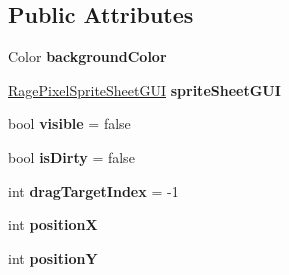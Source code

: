 \subsection*{Public Attributes}
\begin{DoxyCompactItemize}
\item 
Color {\bfseries background\-Color}
\item 
\hypertarget{class_rage_pixel_anim_strip_g_u_i_ab1b522fdd7b0087c4ab464920e52d4aa}{\hyperlink{class_rage_pixel_sprite_sheet_g_u_i}{Rage\-Pixel\-Sprite\-Sheet\-G\-U\-I} {\bfseries sprite\-Sheet\-G\-U\-I}}\label{class_rage_pixel_anim_strip_g_u_i_ab1b522fdd7b0087c4ab464920e52d4aa}

\item 
\hypertarget{class_rage_pixel_anim_strip_g_u_i_ab22e679229cfefcc46ca470488d49c00}{bool {\bfseries visible} = false}\label{class_rage_pixel_anim_strip_g_u_i_ab22e679229cfefcc46ca470488d49c00}

\item 
\hypertarget{class_rage_pixel_anim_strip_g_u_i_a07dea9294c49511cd9f5b5bbfa7a97ae}{bool {\bfseries is\-Dirty} = false}\label{class_rage_pixel_anim_strip_g_u_i_a07dea9294c49511cd9f5b5bbfa7a97ae}

\item 
\hypertarget{class_rage_pixel_anim_strip_g_u_i_a41ebf22267cee30d07a189afe5f1bac9}{int {\bfseries drag\-Target\-Index} = -\/1}\label{class_rage_pixel_anim_strip_g_u_i_a41ebf22267cee30d07a189afe5f1bac9}

\item 
\hypertarget{class_rage_pixel_anim_strip_g_u_i_a9bf6cc8f7e5b00cfbaa2904d37738135}{int {\bfseries position\-X}}\label{class_rage_pixel_anim_strip_g_u_i_a9bf6cc8f7e5b00cfbaa2904d37738135}

\item 
\hypertarget{class_rage_pixel_anim_strip_g_u_i_aec7b93b963494268178de364beebcaf9}{int {\bfseries position\-Y}}\label{class_rage_pixel_anim_strip_g_u_i_aec7b93b963494268178de364beebcaf9}

\end{DoxyCompactItemize}
